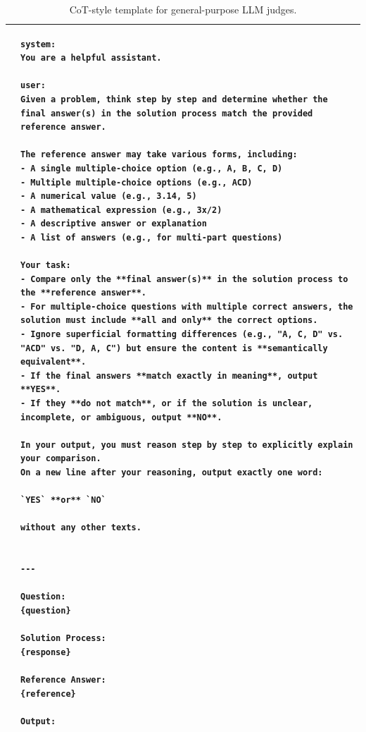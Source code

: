 \begin{table}
\centering
\footnotesize
\begin{tabular}{lp{12cm}}
\toprule

&
\begin{lstlisting}[basicstyle=\ttfamily\scriptsize, breaklines=true, aboveskip=0pt, belowskip=0pt]
system:
You are a helpful assistant.

user:
Given a problem, think step by step and determine whether the final answer(s) in the solution process match the provided reference answer.

The reference answer may take various forms, including:
- A single multiple-choice option (e.g., A, B, C, D)
- Multiple multiple-choice options (e.g., ACD)
- A numerical value (e.g., 3.14, 5)
- A mathematical expression (e.g., 3x/2)
- A descriptive answer or explanation
- A list of answers (e.g., for multi-part questions)

Your task:
- Compare only the **final answer(s)** in the solution process to the **reference answer**.
- For multiple-choice questions with multiple correct answers, the solution must include **all and only** the correct options.
- Ignore superficial formatting differences (e.g., "A, C, D" vs. "ACD" vs. "D, A, C") but ensure the content is **semantically equivalent**.
- If the final answers **match exactly in meaning**, output **YES**.
- If they **do not match**, or if the solution is unclear, incomplete, or ambiguous, output **NO**.

In your output, you must reason step by step to explicitly explain your comparison.  
On a new line after your reasoning, output exactly one word:  

`YES` **or** `NO`  

without any other texts.


---

Question:  
{question}

Solution Process:  
{response}

Reference Answer:  
{reference}

Output:
\end{lstlisting}
\\
\bottomrule
\end{tabular}
\caption{CoT-style template for general-purpose LLM judges.}
\label{tab:appendix:grade_template_cot}
\end{table}




\newcommand{\smalldatasetrow}[1]{
  \addlinespace[3pt]\rowcolor{green!16}%
  \multicolumn{9}{c}{\fontsize{12.5}{13}\selectfont\bfseries #1}\\
  \addlinespace[1pt]\midrule
}



